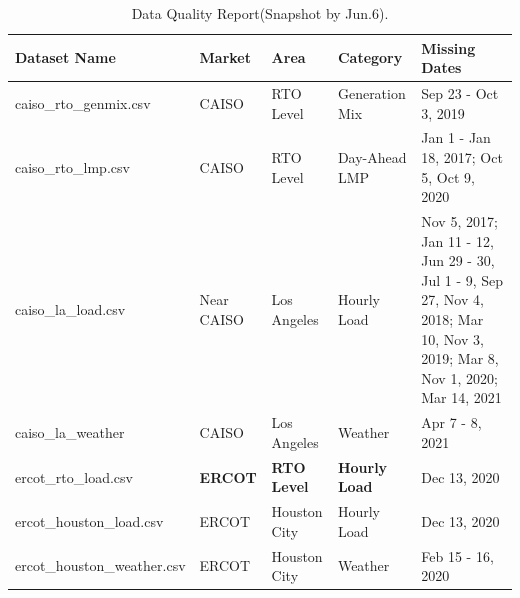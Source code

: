 \documentclass[10pt]{article}
\numberwithin{equation}{section}
\numberwithin{table}{section}
\numberwithin{figure}{section}
\begin{document}
\begin{table}[htbp]
	\scriptsize
	\centering
	\caption{Data Quality Report(Snapshot by Jun.6).}
	\label{tab:dataqualityreport}
	\begin{tabular}{llllp{}}
	\toprule
	\multicolumn{1}{l}{Dataset Name} & \multicolumn{1}{l}{Market} & \multicolumn{1}{l}{Area} & \multicolumn{1}{l}{Category} & \multicolumn{1}{l}{Missing Dates}                                                           \\
	\midrule
	caiso\_rto\_genmix.csv                    & CAISO                               & RTO Level                         & Generation Mix                        & Sep 23 - Oct 3, 2019                                                                                                         \\
	caiso\_rto\_lmp.csv                       & CAISO                               & RTO Level                         & Day-Ahead LMP                         & Jan 1 - Jan 18, 2017; Oct 5, Oct 9, 2020                                                                                     \\
	caiso\_la\_load.csv                       & Near CAISO                          & Los Angeles                       & Hourly Load                           & Nov 5, 2017; Jan 11 - 12, Jun 29 - 30, Jul 1 - 9, Sep 27, Nov 4, 2018; Mar 10, Nov 3, 2019; Mar 8, Nov 1, 2020; Mar 14, 2021 \\
	caiso\_la\_weather                        & CAISO                               & Los Angeles                       & Weather                               & Apr 7 - 8, 2021                                                                                                              \\
	ercot\_rto\_load.csv                      & \textbf{ERCOT}                      & \textbf{RTO Level}                & \textbf{Hourly Load}                  & Dec 13, 2020                                                                                                                 \\
	ercot\_houston\_load.csv                  & ERCOT                               & Houston City                      & Hourly Load                           & Dec 13, 2020                                                                                                                 \\
	ercot\_houston\_weather.csv               & ERCOT                               & Houston City                      & Weather                               & Feb 15 - 16, 2020                                                                                                            \\

\end{tabular}
\end{table}
\end{document}
